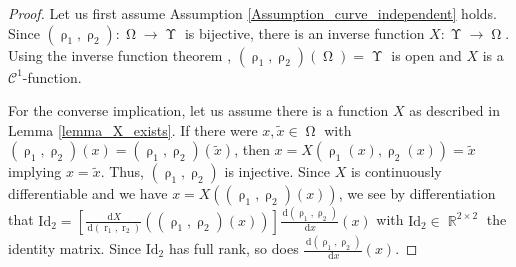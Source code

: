 \documentclass[12pt]{article}
\DeclareMathOperator{\Xgroundset}{\Upsilon}
\DeclareMathOperator{\RR}{{\mathbb{R}}}
\newcommand{\dd}[1]{\,\mathrm{d}{#1}}
\DeclareMathOperator{\rayvariable}{r}
\DeclareMathOperator{\rayinverse}{\rho}
\DeclareMathOperator{\imgdom}{{\Omega}}
\begin{document}
\begin{proof}
Let us first assume Assumption \ref{Assumption_curve_independent} holds.
Since $(\rayinverse_1,\rayinverse_2)\colon \imgdom \to \Xgroundset$ is bijective, there is an inverse function $X\colon \Xgroundset \to \imgdom$.
Using the inverse function theorem \cite[Theorem 1.1.7]{hormander2015analysis}, $(\rayinverse_1,\rayinverse_2)(\imgdom)=\Xgroundset$ is open and $X$ is a $\mathcal{C}^1$-function. 

For the converse implication, let us assume there is a function $X$ as described in Lemma \ref{lemma_X_exists}. If there were $x,\tilde x \in \imgdom$ with $(\rayinverse_1,\rayinverse_2)(x)=(\rayinverse_1,\rayinverse_2)(\tilde x)$, then $x = X(\rayinverse_1(x),\rayinverse_2(x))=\tilde x$ implying $x=\tilde x$. Thus, $(\rayinverse_1,\rayinverse_2)$ is injective. Since $X$ is continuously differentiable and we have $x=X((\rayinverse_1,\rayinverse_2)(x))$, we see by differentiation that $\text{Id}_2= \left[\frac{\dd X}{\dd{(\rayvariable_1,\rayvariable_2)}}((\rayinverse_1,\rayinverse_2)(x))\right]\frac{\dd {(\rayinverse_1,\rayinverse_2)}}{\dd x}(x)$ with $\text{Id}_2\in \RR^{2\times 2}$ the identity matrix. Since $\text{Id}_2$ has full rank, so does $\frac{\dd {(\rayinverse_1,\rayinverse_2)}}{\dd x}(x)$.
\end{proof}
\end{document}

